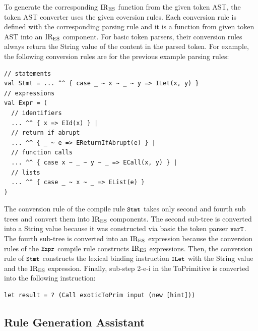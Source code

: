 To generate the corresponding \( \text{IR}_\text{ES} \) function from the given token AST,
the token AST converter uses the given coversion rules. Each conversion rule is
defined with the corresponding parsing rule and it is a function from given token AST
into an \( \text{IR}_\text{ES} \) component. For basic token parsers, their conversion rules
always return the String value of the content in the parsed token.
For example, the following conversion rules are for the previous example
parsing rules:
\begin{lstlisting}[style=myScalastyle]
// statements
val Stmt = ... ^^ { case _ ~ x ~ _ ~ y => ILet(x, y) }
// expressions
val Expr = (
  // identifiers
  ... ^^ { x => EId(x) } |
  // return if abrupt
  ... ^^ { _ ~ e => EReturnIfAbrupt(e) } |
  // function calls
  ... ^^ { case x ~ _ ~ y ~ _ => ECall(x, y) } |
  // lists
  ... ^^ { case _ ~ x ~ _ => EList(e) }
)
\end{lstlisting}
The conversion rule of the compile rule \( \texttt{\small Stmt} \) takes
only second and fourth sub trees and convert them into \( \text{IR}_\text{ES} \) components.
The second sub-tree is converted into a String value because it was
constructed via basic the token parser \( \texttt{\small varT} \).
The fourth sub-tree is converted into an \( \text{IR}_\text{ES} \) expression
because the conversion rules of the \( \texttt{\small Expr} \) compile rule
constructs \( \text{IR}_\text{ES} \) expressions.
Then, the conversion rule of \( \texttt{\small Stmt} \) constructs the
lexical binding instruction \( \texttt{\small ILet} \) with the String value
and the \( \text{IR}_\text{ES} \) expression. Finally, sub-step 2-e-i in the ToPrimitive
is converted into the following instruction:
\begin{lstlisting}[style=ires]
let result = ? (Call exoticToPrim input (new [hint]))
\end{lstlisting}

\subsection{Rule Generation Assistant}

